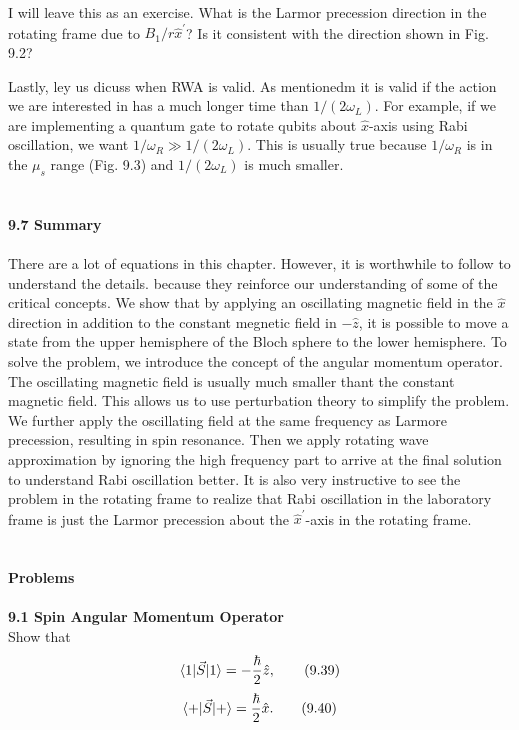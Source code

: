 \documentclass{article}
\begin{document}
I will leave this as an exercise. What is the Larmor precession direction in the rotating frame due to 
$B_1/r\hat{x}^\prime$? Is it consistent with the direction shown in Fig. 9.2?

Lastly, ley us dicuss when RWA is valid. As mentionedm it is valid if the action
we are interested in has a much longer time than $1/(2\omega_L)$. For example, if we are implementing a quantum
gate to rotate qubits about $\hat{x}$-axis using Rabi oscillation,
we want $1/\omega_R\gg 1/(2\omega_L)$. This is usually true because $1/\omega_R$ is in the 
$\mu_s$ range (Fig. 9.3) and $1/(2\omega_L)$ is much smaller.\\\\\\
\textbf{\large 9.7 Summary}\\\\
There are a lot of equations in this chapter. However, it is worthwhile to 
follow to understand the details. because they reinforce our understanding of some of
the critical concepts. We show that by applying an oscillating magnetic field in
the $\hat{x}$ direction in addition to the constant megnetic field in $-\hat{z}$, it is 
possible to move a state from the upper hemisphere of the Bloch sphere to the lower hemisphere.
To solve the problem, we introduce the concept of the angular momentum operator.
The oscillating magnetic field is usually much smaller thant the constant magnetic field.
This allows us to use perturbation theory to simplify the problem. We further apply
the oscillating field at the same frequency as Larmore precession, resulting in spin resonance.
Then we apply rotating wave approximation by ignoring the high frequency part to arrive
at the final solution to understand Rabi oscillation better. It is also very instructive to see
the problem in the rotating frame to realize that Rabi oscillation in the laboratory frame is just
the Larmor precession about the $\hat{x}^\prime$-axis in the rotating frame.\\\\\\
\textbf{\large Problems}\\\\
\textbf{9.1 Spin Angular Momentum Operator}\\
Show that
\begin{equation}\label{eq 9.39}
    \braket{1|\vec{S}|1}=-\frac{\hbar}{2}\hat{z},\tag{9.39}
\end{equation}
\begin{equation}\label{eq 9.40}
    \braket{+|\vec{S}|+}=\frac{\hbar}{2}\hat{x}.\tag{9.40}
\end{equation}
\end{document}
